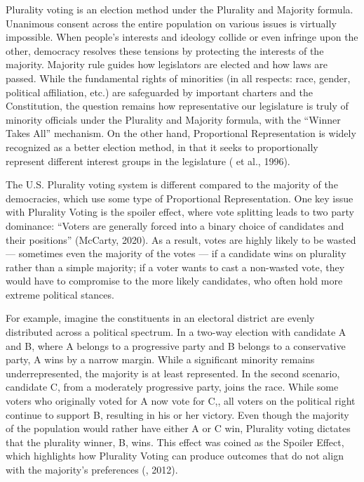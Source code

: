 Plurality voting is an election method under the Plurality and Majority formula. Unanimous consent across the entire population on various issues is virtually impossible. When people’s interests and ideology collide or even infringe upon the other, democracy resolves these tensions by protecting the interests of the majority. Majority rule guides how legislators are elected and how laws are passed. While the fundamental rights of minorities (in all respects: race, gender, political affiliation, etc.) are safeguarded by important charters and the Constitution, the question remains how representative our legislature is truly of minority officials under the Plurality and Majority formula, with the “Winner Takes All” mechanism. On the other hand, Proportional Representation is widely recognized as a better election method, in that it seeks to proportionally represent different interest groups in the legislature (\cite{mudambi1996} et al., 1996). 

The U.S. Plurality voting system is different compared to the majority of the democracies, which use some type of Proportional Representation. One key issue with Plurality Voting is the spoiler effect, where vote splitting leads to two party dominance: “Voters are generally forced into a binary choice of candidates and their positions” (McCarty, 2020). As a result, votes are highly likely to be wasted --- sometimes even the majority of the votes --- if a candidate wins on plurality rather than a simple majority; if a voter wants to cast a non-wasted vote, they would have to compromise to the more likely candidates, who often hold more extreme political stances. 

For example, imagine the constituents in an electoral district are evenly distributed across a political spectrum. In a two-way election with candidate A and B, where A belongs to a progressive party and B belongs to a conservative party, A wins by a narrow margin. While a significant minority remains underrepresented, the majority is at least represented. In the second scenario, candidate C, from a moderately progressive party, joins the race. While some voters who originally voted for A now vote for C,, all voters on the political right continue to support B, resulting in his or her victory. Even though the majority of the population would rather have either A or C win, Plurality voting dictates that the plurality winner, B, wins. This effect was coined as the Spoiler Effect, which highlights how Plurality Voting can produce outcomes that do not align with the majority’s preferences (\cite{maxmin2012}, 2012). 

